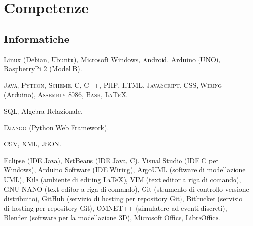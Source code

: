 %
%
%
%
%
%



\section{Competenze}

\subsection{Informatiche}

{Linux (Debian, Ubuntu), Microsoft Windows, Android, Arduino (UNO), RaspberryPi
2 (Model B).}

{\textsc{Java}, \textsc{Python}, \textsc{Scheme}, \textsc{C}, \textsc{C++},
\textsc{PHP}, \textsc{HTML}, \textsc{JavaScript}, \textsc{CSS}, \textsc{Wiring}
(Arduino), \textsc{Assembly 8086}, \textsc{Bash}, \textsc{\LaTeX}.}

{\textsc{SQL}, Algebra Relazionale.}

{\textsc{Django} (Python Web Framework).}

{\textsc{CSV}, \textsc{XML}, \textsc{JSON}.}

{Eclipse (IDE Java), NetBeans (IDE Java, C), Visual Studio (IDE C per Windows),
Arduino Software (IDE Wiring), ArgoUML (software di modellazione UML), Kile
(ambiente di editing \LaTeX), VIM (text editor a riga di comando), GNU NANO
(text editor a riga di comando), Git (strumento di controllo versione
distribuito), GitHub (servizio di hosting per repository Git), Bitbucket
(servizio di hosting per repository Git), OMNET++ (simulatore ad eventi
discreti), Blender (software per la modellazione 3D), Microsoft Office,
LibreOffice.}



